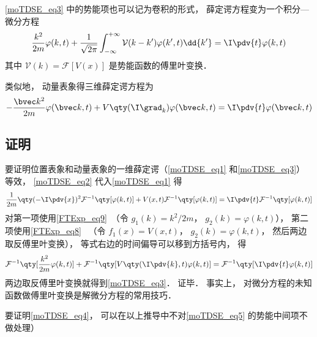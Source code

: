 \autoref{moTDSE_eq3} 中的势能项也可以记为卷积的形式， 薛定谔方程变为一个积分—微分方程
\begin{equation}\label{moTDSE_eq4}
\frac{k^2}{2m}\varphi(k, t) + \frac{1}{\sqrt{2\pi}}\int_{-\infty}^{+\infty} \mathcal{V}(k-k') \varphi(k', t) \dd{k'} = \I \pdv{t} \varphi(k,t)
\end{equation}
其中 $\mathcal{V}(k) = \mathcal{F}[V(x)]$ 是势能函数的傅里叶变换．

类似地， 动量表象得三维薛定谔方程为
\begin{equation}
-\frac{\bvec k^2}{2m}\varphi(\bvec k, t) + V\qty(\I \grad_k)\varphi(\bvec k, t) = \I \pdv{t} \varphi(\bvec k,t)
\end{equation}

\subsection{证明}
要证明位置表象和动量表象的一维薛定谔（\autoref{moTDSE_eq1} 和\autoref{moTDSE_eq3}）等效， \autoref{moTDSE_eq2} 代入\autoref{moTDSE_eq1} 得
\begin{equation}\label{moTDSE_eq5}
\frac{1}{2m}\qty(-\I\pdv{x})^2 \mathcal{F}^{-1}\qty[\varphi(k, t)] + V(x, t)\mathcal{F}^{-1}\qty[\varphi(k, t)] = \I \pdv{t}\mathcal{F}^{-1}\qty[\varphi(k, t)]
\end{equation}
对第一项使用\autoref{FTExp_eq9}~（令 $g_1(k) = k^2/2m$， $g_2(k) = \varphi(k, t)$）， 第二项使用\autoref{FTExp_eq8}~ （令 $f_1(x) = V(x, t)$， $g_2(k) = \varphi(k, t)$， 然后两边取反傅里叶变换）， 等式右边的时间偏导可以移到方括号内， 得
\begin{equation}
\mathcal{F}^{-1}\qty[\frac{k^2}{2m}\varphi(k,t)] + \mathcal{F}^{-1}\qty[V\qty(\I \pdv{k}, t)\varphi(k,t)] = \mathcal{F}^{-1}\qty[\I \pdv{t}\varphi(k,t)]
\end{equation}
两边取反傅里叶变换就得到\autoref{moTDSE_eq3}． 证毕． 事实上， 对微分方程的未知函数做傅里叶变换是解微分方程的常用技巧． %

要证明\autoref{moTDSE_eq4}， 可以在以上推导中不对\autoref{moTDSE_eq5} 的势能中间项不做处理）
